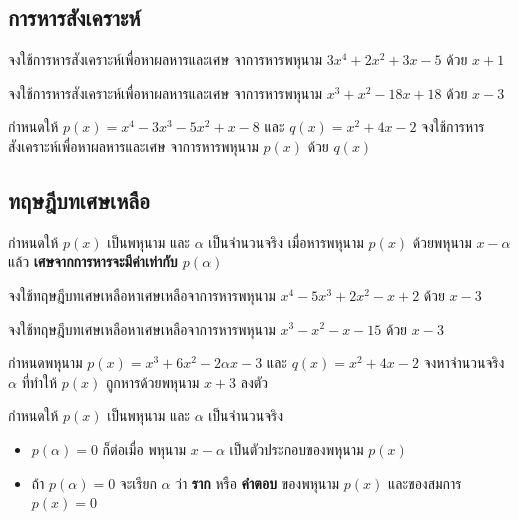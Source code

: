 \subsection{การหารสังเคราะห์}
\begin{examplebox}
	จงใช้การหารสังเคราะห์เพื่อหาผลหารและเศษ จาการหารพหุนาม $3x^4+2x^2+3x-5$ ด้วย $x+1$
\end{examplebox}
\vspace{10cm}
\begin{examplebox}
	จงใช้การหารสังเคราะห์เพื่อหาผลหารและเศษ จาการหารพหุนาม $x^3+x^2-18x+18$ ด้วย $x-3$
\end{examplebox}


\begin{examplebox}
	กำหนดให้ $p(x)=x^4-3x^3-5x^2+x-8$ และ $q(x)=x^2+4x-2$ จงใช้การหารสังเคราะห์เพื่อหาผลหารและเศษ จาการหารพหุนาม $p(x)$ ด้วย $q(x)$
\end{examplebox}

\subsection{ทฤษฎีบทเศษเหลือ}
\begin{theorembox}
	กำหนดให้ $p(x)$ เป็นพหุนาม และ $\alpha$ เป็นจำนวนจริง  
	เมื่อหารพหุนาม $p(x)$ ด้วยพหุนาม $x-\alpha$ แล้ว  
	\textbf{เศษจากการหารจะมีค่าเท่ากับ $p(\alpha)$}
\end{theorembox}

\begin{examplebox}
	จงใช้ทฤษฎีบทเศษเหลือหาเศษเหลือจาการหารพหุนาม $x^4-5x^3+2x^2-x+2$ ด้วย $x-3$
\end{examplebox}

\begin{examplebox}
	จงใช้ทฤษฎีบทเศษเหลือหาเศษเหลือจาการหารพหุนาม $x^3-x^2-x-15$ ด้วย $x-3$
\end{examplebox}

\begin{examplebox}
	กำหนดพหุนาม $p(x)=x^3+6x^2-2\alpha x-3$ และ $q(x)=x^2+4x-2$ จงหาจำนวนจริง $\alpha$ ที่ทำให้ $p(x)$ ถูกหารด้วยพหุนาม $x+3$ ลงตัว
\end{examplebox}

\begin{remarkbox}
	กำหนดให้ $p(x)$ เป็นพหุนาม และ $\alpha$ เป็นจำนวนจริง
	\begin{itemize}
		\item $p(\alpha)=0$ ก็ต่อเมื่อ พหุนาม $x-\alpha$ เป็นตัวประกอบของพหุนาม $p(x)$
		\item ถ้า $p(\alpha)=0$ จะเรียก $\alpha$ ว่า \textbf{ราก} หรือ \textbf{คำตอบ} ของพหุนาม $p(x)$  และของสมการ $p(x)=0$
	\end{itemize}
\end{remarkbox}


